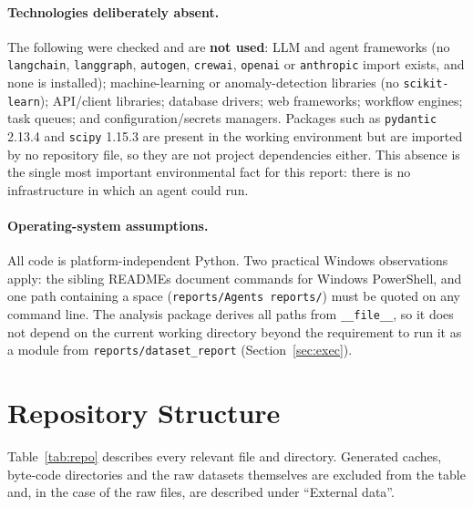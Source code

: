 \documentclass[11pt,a4paper]{article}
\newcommand{\code}[1]{\texttt{#1}}
\begin{document}
\paragraph{Technologies deliberately absent.} The following were checked and are \textbf{not used}: LLM and agent frameworks (no \code{langchain}, \code{langgraph}, \code{autogen}, \code{crewai}, \code{openai} or \code{anthropic} import exists, and none is installed); machine-learning or anomaly-detection libraries (no \code{scikit-learn}); API/client libraries; database drivers; web frameworks; workflow engines; task queues; and configuration/secrets managers. Packages such as \code{pydantic} 2.13.4 and \code{scipy} 1.15.3 are present in the working environment but are imported by no repository file, so they are not project dependencies either. This absence is the single most important environmental fact for this report: there is no infrastructure in which an agent could run.

\paragraph{Operating-system assumptions.} All code is platform-independent Python. Two practical Windows observations apply: the sibling READMEs document commands for Windows PowerShell, and one path containing a space (\code{reports/Agents reports/}) must be quoted on any command line. The analysis package derives all paths from \code{\_\_file\_\_}, so it does not depend on the current working directory beyond the requirement to run it as a module from \code{reports/dataset\_report} (Section~\ref{sec:exec}).

\section{Repository Structure}
\label{sec:repo}
Table~\ref{tab:repo} describes every relevant file and directory. Generated caches, byte-code directories and the raw datasets themselves are excluded from the table and, in the case of the raw files, are described under ``External data''.
\end{document}

